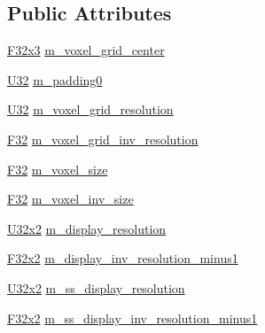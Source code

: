 \subsection*{Public Attributes}
\begin{DoxyCompactItemize}
\item 
\hyperlink{namespacemage_a73fbe0da4b8d5bc156bb8453e5b63a17}{F32x3} \hyperlink{structmage_1_1rendering_1_1_game_buffer_a4dddeeb0f0bfb8cdb328338657910f3c}{m\+\_\+voxel\+\_\+grid\+\_\+center}
\item 
\hyperlink{namespacemage_a41c104c036fba3756a74e19f793eeaa1}{U32} \hyperlink{structmage_1_1rendering_1_1_game_buffer_ac0e92071c7409a5408047bd6116da200}{m\+\_\+padding0}
\item 
\hyperlink{namespacemage_a41c104c036fba3756a74e19f793eeaa1}{U32} \hyperlink{structmage_1_1rendering_1_1_game_buffer_a705874f8b8be19a790faf47639e750a5}{m\+\_\+voxel\+\_\+grid\+\_\+resolution}
\item 
\hyperlink{namespacemage_aa97e833b45f06d60a0a9c4fc22ae02c0}{F32} \hyperlink{structmage_1_1rendering_1_1_game_buffer_a613f32740ac3e7f6b1e32f9976447b22}{m\+\_\+voxel\+\_\+grid\+\_\+inv\+\_\+resolution}
\item 
\hyperlink{namespacemage_aa97e833b45f06d60a0a9c4fc22ae02c0}{F32} \hyperlink{structmage_1_1rendering_1_1_game_buffer_a792ab7eca88d2a2f425d06df602d6e11}{m\+\_\+voxel\+\_\+size}
\item 
\hyperlink{namespacemage_aa97e833b45f06d60a0a9c4fc22ae02c0}{F32} \hyperlink{structmage_1_1rendering_1_1_game_buffer_add22463d853cd1b33c605257d44bec07}{m\+\_\+voxel\+\_\+inv\+\_\+size}
\item 
\hyperlink{namespacemage_a88e05bff0300120c013285d3dcad95c5}{U32x2} \hyperlink{structmage_1_1rendering_1_1_game_buffer_a0d1ae294ea443c48c348af75442a8f54}{m\+\_\+display\+\_\+resolution}
\item 
\hyperlink{namespacemage_aa87237ad091f5cd7da612b8523fc108f}{F32x2} \hyperlink{structmage_1_1rendering_1_1_game_buffer_a046916a46d80f979ac4f16c2ba58d8ef}{m\+\_\+display\+\_\+inv\+\_\+resolution\+\_\+minus1}
\item 
\hyperlink{namespacemage_a88e05bff0300120c013285d3dcad95c5}{U32x2} \hyperlink{structmage_1_1rendering_1_1_game_buffer_a76b01da64f8eb8f7ba431371a71d35a4}{m\+\_\+ss\+\_\+display\+\_\+resolution}
\item 
\hyperlink{namespacemage_aa87237ad091f5cd7da612b8523fc108f}{F32x2} \hyperlink{structmage_1_1rendering_1_1_game_buffer_a471b606cff83755f74f855c780c3dc2a}{m\+\_\+ss\+\_\+display\+\_\+inv\+\_\+resolution\+\_\+minus1}
\end{DoxyCompactItemize}


